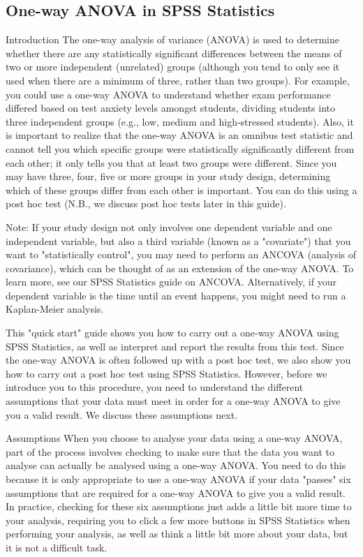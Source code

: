 \documentclass[]{article}
\begin{document}
\subsection{One-way ANOVA in SPSS Statistics}

Introduction
The one-way analysis of variance (ANOVA) is used to determine whether there are any statistically significant differences between the means of two or more independent (unrelated) groups (although you tend to only see it used when there are a minimum of three, rather than two groups). For example, you could use a one-way ANOVA to understand whether exam performance differed based on test anxiety levels amongst students, dividing students into three independent groups (e.g., low, medium and high-stressed students). Also, it is important to realize that the one-way ANOVA is an omnibus test statistic and cannot tell you which specific groups were statistically significantly different from each other; it only tells you that at least two groups were different. Since you may have three, four, five or more groups in your study design, determining which of these groups differ from each other is important. You can do this using a post hoc test (N.B., we discuss post hoc tests later in this guide).

Note: If your study design not only involves one dependent variable and one independent variable, but also a third variable (known as a "covariate") that you want to "statistically control", you may need to perform an ANCOVA (analysis of covariance), which can be thought of as an extension of the one-way ANOVA. To learn more, see our SPSS Statistics guide on ANCOVA. Alternatively, if your dependent variable is the time until an event happens, you might need to run a Kaplan-Meier analysis.

This "quick start" guide shows you how to carry out a one-way ANOVA using SPSS Statistics, as well as interpret and report the results from this test. Since the one-way ANOVA is often followed up with a post hoc test, we also show you how to carry out a post hoc test using SPSS Statistics. However, before we introduce you to this procedure, you need to understand the different assumptions that your data must meet in order for a one-way ANOVA to give you a valid result. We discuss these assumptions next.

Assumptions
When you choose to analyse your data using a one-way ANOVA, part of the process involves checking to make sure that the data you want to analyse can actually be analysed using a one-way ANOVA. You need to do this because it is only appropriate to use a one-way ANOVA if your data "passes" six assumptions that are required for a one-way ANOVA to give you a valid result. In practice, checking for these six assumptions just adds a little bit more time to your analysis, requiring you to click a few more buttons in SPSS Statistics when performing your analysis, as well as think a little bit more about your data, but it is not a difficult task.
\end{document}
